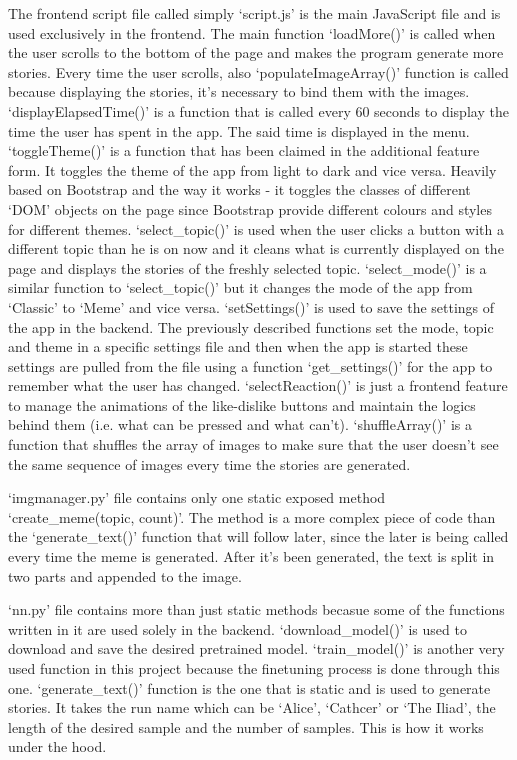 \documentclass[12pt]{report}
\begin{document}
\begin{appendices}
The frontend script file called simply `script.js' is the main JavaScript file and is used exclusively in the frontend.
The main function `loadMore()' is called when the user scrolls to the bottom of the page and makes the program generate
more stories. Every time the user scrolls, also `populateImageArray()' function is called because displaying the stories,
it's necessary to bind them with the images. `displayElapsedTime()' is a function that is called every 60 seconds to display
the time the user has spent in the app. The said time is displayed in the menu. `toggleTheme()' is a function that has
been claimed in the additional feature form. It toggles the theme of the app from light to dark and vice versa. Heavily based
on Bootstrap and the way it works - it toggles the classes of different `DOM' objects on the page since Bootstrap
provide different colours and styles for different themes. `select\_topic()' is used when the user clicks a button with a different
topic than he is on now and it cleans what is currently displayed on the page and displays the stories of the freshly selected topic.
`select\_mode()' is a similar function to `select\_topic()' but it changes the mode of the app from `Classic' to `Meme' and vice versa.
`setSettings()' is used to save the settings of the app in the backend. The previously described functions set the mode, topic and theme in
a specific settings file and then when the app is started these settings are pulled from the file using a function `get\_settings()'
for the app to remember what the user has changed. `selectReaction()' is just a frontend feature to manage the animations
of the like-dislike buttons and maintain the logics behind them (i.e. what can be pressed and what can't). `shuffleArray()'
is a function that shuffles the array of images to make sure that the user doesn't see the same sequence of images every time
the stories are generated.

`imgmanager.py' file contains only one static exposed method `create\_meme(topic, count)'. The method is a more complex piece of code
than the `generate\_text()' function that will follow later, since the later is being called every time the meme is generated.
After it's been generated, the text is split in two parts and appended to the image.

`nn.py' file contains more than just static methods becasue some of the functions written in it are used solely in the
backend. `download\_model()' is used to download and save the desired pretrained model. `train\_model()' is another very used function
in this project because the finetuning process is done through this one. `generate\_text()' function is the one that is
static and is used to generate stories. It takes the run name which can be `Alice', `Cathcer' or `The Iliad', the
length of the desired sample and the number of samples. This is how it works under the hood.


\end{appendices}
\end{document}
